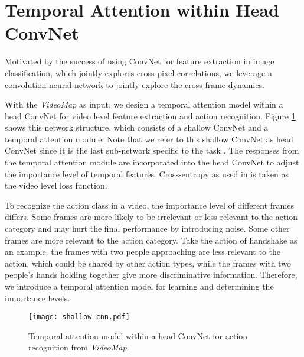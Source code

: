 \documentclass[english, 10pt, twocolumn, twoside]{IEEEtran}
\begin{document}
\section{Temporal Attention within Head ConvNet}
\label{ssecAttention}

Motivated by the success of using ConvNet for feature extraction in image classification, which jointly explores cross-pixel correlations, we leverage a convolution neural network to jointly explore the cross-frame dynamics.


With the \emph{VideoMap} as input, we design a temporal attention model within a head ConvNet for video level feature extraction and action recognition. Figure \ref{fig:shallow-cnn} shows this network structure, which consists of a shallow ConvNet and a temporal attention module. Note that we refer to this shallow ConvNet as head ConvNet since it is the last sub-network specific to the task \cite{he2017mask}. The responses from the temporal attention module are incorporated into the head ConvNet to adjust the importance level of temporal features. Cross-entropy as used in \cite{wang2016temporal} is taken as the video level loss function.

To recognize the action class in a video, the importance level of different frames differs. Some frames are more likely to be irrelevant or less relevant to the action category and may hurt the final performance by introducing noise. Some other frames are more relevant to the action category. Take the action of handshake as an example, the frames with two people approaching are less relevant to the action, which could be shared by other action types, while the frames with two people's hands holding together give more discriminative information. Therefore, we introduce a temporal attention model for learning and determining the importance levels.

\begin{figure}[t]
\begin{center}
\texttt{[image: shallow-cnn.pdf]}
\end{center}
\vspace{-7mm}
\begin{center}
\caption[width=0.95\linewidth]{Temporal attention model within a head ConvNet for action recognition from \emph{VideoMap}.}
\end{center}
\label{fig:shallow-cnn}
\vspace{-4mm}
\end{figure}
\end{document}
